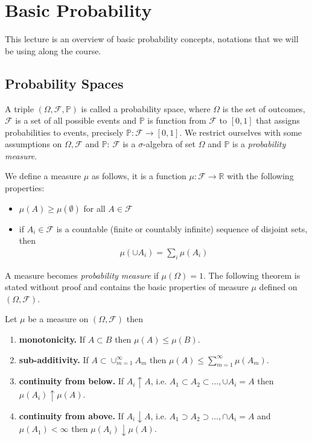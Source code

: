 \section{Basic Probability}
This lecture is an overview of basic probability concepts, notations that we will be using along the course. 
\subsection{Probability Spaces}
A triple $(\Omega, \mathcal{F}, \mathbb{P})$ is called a probability space, where $\Omega$ is the set of outcomes, $\mathcal{F}$ is a set of all possible events and $\mathbb{P}$ is function from $\mathcal{F}$ to $[0, 1]$ that assigns probabilities to events, precisely $\mathbb{P} : \mathcal{F} \to [0, 1]$. We restrict ourselves with some assumptions on $\Omega, \mathcal{F}$ and $\mathbb{P}$: $\mathcal{F}$ is a $\sigma$-algebra of set $\Omega$ and $\mathbb{P}$ is a {\it{probability measure}}. 
\par We define a measure $\mu$ as follows, it is a function $\mu : \mathcal{F} \to \mathbb{R}$ with the following properties: 
\begin{itemize}
    \item $\mu(A) \ge \mu(\emptyset)$ for all $A \in \mathcal{F}$
    \item if $A_i \in \mathcal{F}$ is a countable (finite or countably infinite) sequence of disjoint sets, then 
    \begin{align}
        \mu(\cup A_i) = \sum_i \mu(A_i)
    \end{align}
\end{itemize}
A measure becomes {\it{probability measure}} if $\mu(\Omega) = 1$. The following theorem is stated without proof and contains the basic properties of measure $\mu$ defined on $(\Omega, \mathcal{F})$.
\begin{thm}
Let $\mu$ be a measure on $(\Omega, \mathcal{F})$ then 
\begin{enumerate}
    \item \textbf{monotonicity.} If $A \subset B$ then $\mu(A) \le \mu(B)$. 
    \item \textbf{sub-additivity.} If $A \subset \cup_{m=1}^{\infty} A_m$ then $\mu(A) \le \sum_{m=1}^{\infty} \mu(A_m)$.
    \item \textbf{continuity from below.} If $A_i \uparrow A$, i.e. $A_1 \subset A_2 \subset \dots, \cup A_i = A$ then $\mu(A_i) \uparrow \mu(A)$.
    \item \textbf{continuity from above.} If $A_i \downarrow A$, i.e. $A_1 \supset A_2 \supset \dots, \cap A_i = A$ and $\mu(A_1) < \infty$ then $\mu(A_i) \downarrow \mu(A)$.
\end{enumerate}
\end{thm}
